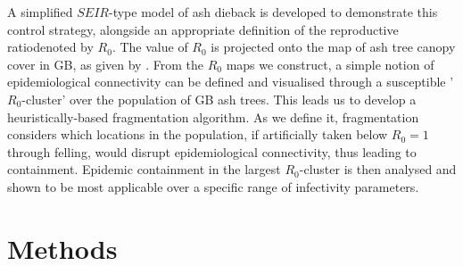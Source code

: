 A simplified $SEIR$-type model of ash dieback is developed to demonstrate this control strategy, alongside an appropriate definition of the reproductive ratio\textemdash denoted by $R_0$. The value of $R_0$ is projected onto the map of ash tree canopy cover in GB, as given by \cite{hill.data}. From the $R_0$ maps we construct, a simple notion of epidemiological connectivity can be defined and visualised through a susceptible '$R_0$-cluster' over the population of GB ash trees. This leads us to develop a heuristically-based fragmentation algorithm. As we define it, fragmentation considers which locations in the population, if artificially taken below $R_0 = 1$ through felling, would disrupt epidemiological connectivity\textemdash, thus leading to containment. Epidemic containment in the largest $R_0$-cluster is then analysed and shown to be most applicable over a specific range of infectivity parameters.




\section{Methods}

